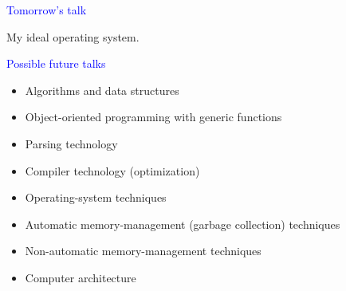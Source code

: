 \documentclass{slides}
\newcommand{\ti}[1]{\begin{center}\Large{\textcolor{blue}{#1}}\end{center}}
\begin{document}
\begin{slide}\ti{Tomorrow's talk}

My ideal operating system.

\vfill\end{slide}
\begin{slide}\ti{Possible future talks}

  \begin{itemize}
  \item Algorithms and data structures
  \item Object-oriented programming with generic functions
  \item Parsing technology
  \item Compiler technology (optimization)
  \item Operating-system techniques
  \item Automatic memory-management (garbage collection) techniques
  \item Non-automatic memory-management techniques
  \item Computer architecture
  \end{itemize}

\vfill\end{slide}



\end{document}
